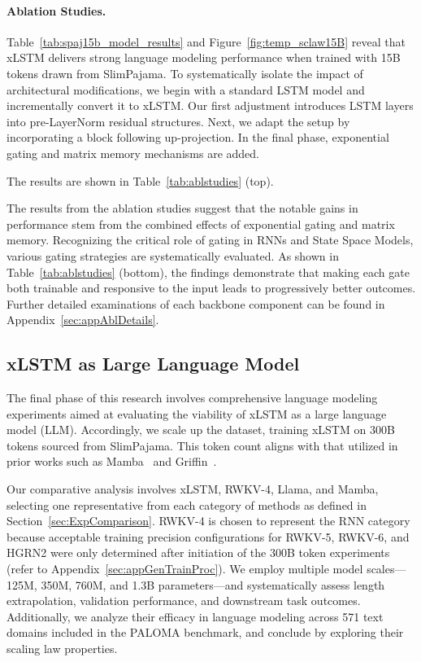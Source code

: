\paragraph{Ablation Studies.}
Table~\ref{tab:spaj15b_model_results} and Figure~\ref{fig:temp_sclaw15B} reveal that xLSTM delivers strong language modeling performance when trained with 15B tokens drawn from SlimPajama. To systematically isolate the impact of architectural modifications, we begin with a standard LSTM model and incrementally convert it to xLSTM. Our first adjustment introduces LSTM layers into pre-LayerNorm residual structures. Next, we adapt the setup by incorporating a block following up-projection. In the final phase, exponential gating and matrix memory mechanisms are added.

The results are shown in Table~\ref{tab:ablstudies} (top). 

The results from the ablation studies suggest that the notable gains in performance stem from the combined effects of exponential gating and matrix memory. Recognizing the critical role of gating in RNNs and State Space Models, various gating strategies are systematically evaluated. As shown in Table~\ref{tab:ablstudies} (bottom), the findings demonstrate that making each gate both trainable and responsive to the input leads to progressively better outcomes. Further detailed examinations of each backbone component can be found in Appendix~\ref{sec:appAblDetails}.

\subsection{xLSTM as Large Language Model}
\label{sec:ExpLanguage}

The final phase of this research involves comprehensive language modeling experiments aimed at evaluating the viability of xLSTM as a large language model (LLM). Accordingly, we scale up the dataset, training xLSTM on 300B tokens sourced from SlimPajama. This token count aligns with that utilized in prior works such as Mamba~\citep{Gu:24arxiv} and Griffin~\citep{De:24arxiv}.

Our comparative analysis involves xLSTM, RWKV-4, Llama, and Mamba, selecting one representative from each category of methods as defined in Section~\ref{sec:ExpComparison}.
RWKV-4 is chosen to represent the RNN category because acceptable training precision configurations for RWKV-5, RWKV-6, and HGRN2 were only determined after initiation of the 300B token experiments (refer to Appendix~\ref{sec:appGenTrainProc}).
We employ multiple model scales—125M, 350M, 760M, and 1.3B parameters—and systematically assess length extrapolation, validation performance, and downstream task outcomes. Additionally, we analyze their efficacy in language modeling across 571 text domains included in the PALOMA benchmark, and conclude by exploring their scaling law properties.

